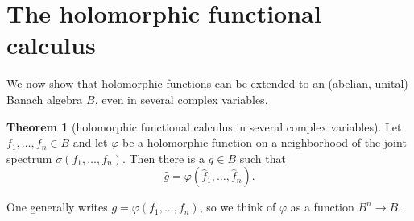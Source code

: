 \documentclass[12pt]{report}
\theoremstyle{definition}
\newtheorem{theorem}{Theorem}[chapter]
\begin{document}
\section{The holomorphic functional calculus}
We now show that holomorphic functions can be extended to an (abelian, unital) Banach algebra $B$, even in several complex variables.
\begin{theorem}[holomorphic functional calculus in several complex variables]
    Let $f_1, \dots, f_n \in B$ and let $\varphi$ be a holomorphic function on a neighborhood of the joint spectrum $\sigma(f_1, \dots, f_n)$. Then there is a $g \in B$ such that
    $$\hat g = \varphi(\hat f_1, \dots, \hat f_n).$$
\end{theorem}
One generally writes $g = \varphi(f_1, \dots, f_n)$, so we think of $\varphi$ as a function $B^n \to B$.
    
\end{document}
